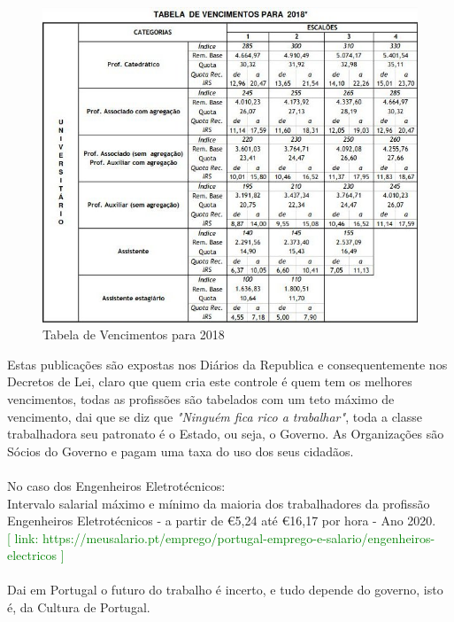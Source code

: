 \begin{figure}[H]
	\centering
	\includegraphics[scale=0.52]{./image/Salary/Universidade.jpg}
	\caption{Tabela de Vencimentos para 2018 \cite{article_2}}
\end{figure}
Estas publicações são expostas nos Diários da Republica e consequentemente nos Decretos de Lei, claro que quem cria este controle é quem tem os melhores vencimentos, todas as profissões são tabelados com um teto máximo de vencimento, dai que se diz que \textit{"Ninguém fica rico a trabalhar"}, toda a classe trabalhadora seu patronato é o Estado, ou seja, o Governo. As Organizações são Sócios do Governo e pagam uma taxa do uso dos seus cidadãos.\\
\\
No caso dos Engenheiros Eletrotécnicos:\\
Intervalo salarial máximo e mínimo da maioria dos trabalhadores da profissão Engenheiros Eletrotécnicos - a partir de \euro 5,24 até \euro 16,17 por hora - Ano 2020. \\
\textcolor{green}{[ link: \quad  https://meusalario.pt/emprego/portugal-emprego-e-salario/engenheiros-electricos ]} \\
\\
Dai em Portugal o futuro do trabalho é incerto, e tudo depende do governo, isto é, da Cultura de Portugal.
\newpage
